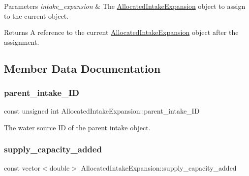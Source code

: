 \begin{DoxyParams}{Parameters}
{\em intake\+\_\+expansion} & The {\ttfamily \mbox{\hyperlink{classAllocatedIntakeExpansion}{Allocated\+Intake\+Expansion}}} object to assign to the current object.\\
\hline
\end{DoxyParams}
\begin{DoxyReturn}{Returns}
A reference to the current {\ttfamily \mbox{\hyperlink{classAllocatedIntakeExpansion}{Allocated\+Intake\+Expansion}}} object after the assignment. 
\end{DoxyReturn}


\subsection{Member Data Documentation}
\mbox{\label{classAllocatedIntakeExpansion_a725ce7276ef9158da9fa7e2b1e217b14}} 
\subsubsection{\texorpdfstring{parent\+\_\+intake\+\_\+\+ID}{parent\_intake\_ID}}
{\footnotesize\ttfamily const unsigned int Allocated\+Intake\+Expansion\+::parent\+\_\+intake\+\_\+\+ID}



The water source ID of the parent intake object. 

\mbox{\label{classAllocatedIntakeExpansion_ad788b8373f3e8c9eb2a910c370e91f7c}} 
\subsubsection{\texorpdfstring{supply\+\_\+capacity\+\_\+added}{supply\_capacity\_added}}
{\footnotesize\ttfamily const vector$<$double$>$ Allocated\+Intake\+Expansion\+::supply\+\_\+capacity\+\_\+added}




